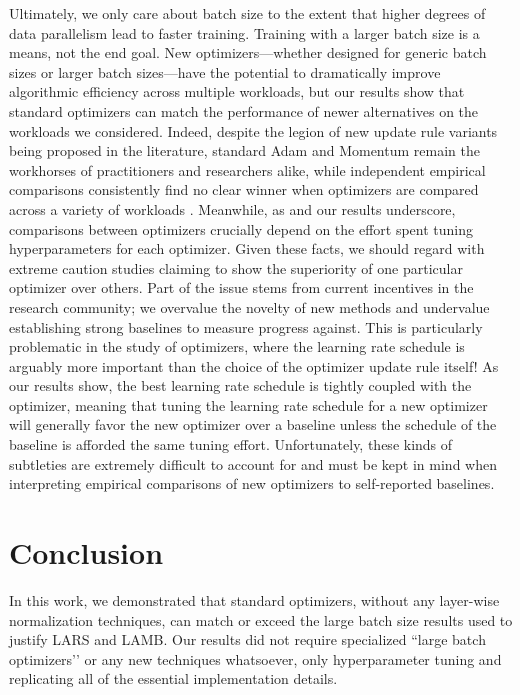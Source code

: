 \documentclass{article}
\begin{document}
Ultimately, we only care about batch size to the extent that higher degrees of data parallelism lead to faster training. Training with a larger batch size is a means, not the end goal.
New optimizers---whether designed for generic batch sizes or larger batch sizes---have the potential to dramatically improve algorithmic efficiency across multiple workloads, but our results show that standard optimizers can match the performance of newer alternatives on the workloads we considered.
Indeed, despite the legion of new update rule variants being proposed in the literature, standard Adam and Momentum remain the workhorses of practitioners and researchers alike, while independent empirical comparisons consistently find no clear winner when optimizers are compared across a variety of workloads \citep{schmidt2020descending}. Meanwhile, as \citet{choi2019empirical} and our results underscore, comparisons between optimizers crucially depend on the effort spent tuning hyperparameters for each optimizer. Given these facts, we should regard with extreme caution studies claiming to show the superiority of one particular optimizer over others. Part of the issue stems from current incentives in the research community; we overvalue the novelty of new methods and undervalue establishing strong baselines to measure progress against. This is particularly problematic in the study of optimizers, where the learning rate schedule is arguably more important than the choice of the optimizer update rule itself! As our results show, the best learning rate schedule is tightly coupled with the optimizer, meaning that tuning the learning rate schedule for a new optimizer will generally favor the new optimizer over a baseline unless the schedule of the baseline is afforded the same tuning effort. Unfortunately, these kinds of subtleties are extremely difficult to account for and must be kept in mind when interpreting empirical comparisons of new optimizers to self-reported baselines.

 \vspace{-1em} \section{Conclusion}\label{sec:conclusion}

In this work, we demonstrated that standard optimizers, without any layer-wise normalization techniques, can match or exceed the large batch size results used to justify LARS and LAMB. 
Our results did not require specialized ``large batch optimizers’’ or any new techniques whatsoever, only hyperparameter tuning and replicating all of the essential implementation details.
\end{document}
